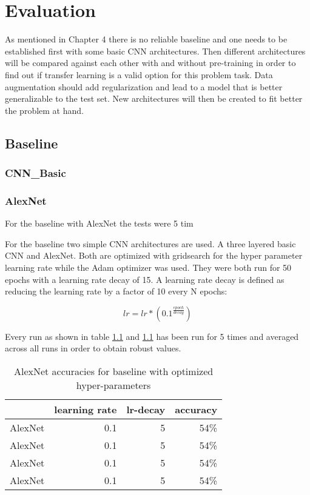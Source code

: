 \chapter{Evaluation}

As mentioned in Chapter 4 there is no reliable baseline and one needs to be established first with some basic CNN architectures. Then different architectures will be compared against each other with and without pre-training in order to find out if transfer learning is a valid option for this problem task. Data augmentation should add regularization and lead to a model that is better generalizable to the test set. New architectures will then be created to fit better the problem at hand.

\section{Baseline}

\subsection{CNN\_Basic}

\subsection{AlexNet}

For the baseline with AlexNet the tests were 5 tim

For the baseline two simple CNN architectures are used. A three layered basic CNN and AlexNet. Both are optimized with gridsearch for the hyper parameter learning rate while the Adam optimizer was used. They were both run for 50 epochs with a learning rate decay of 15. A learning rate decay is defined as reducing the learning rate by a factor of 10 every N epochs:

\[ lr = lr * (0.1^{\frac{epoch}{decay}}) \]


Every run as shown in table \ref{tbl:similarity-test-map} and \ref{tbl:similarity-test-map} has been run for 5 times and averaged across all runs in order to obtain robust values.

\begin{table}[t] \centering
{}
\caption{AlexNet accuracies for baseline with optimized hyper-parameters}
\begin{tabular}{@{}rrrr@{}}
\toprule & learning rate & lr-decay & accuracy \\
\midrule
AlexNet		& 0.1 		& 5		& 54\%  \\
AlexNet		& 0.1 		& 5		& 54\%  \\
AlexNet		& 0.1 		& 5		& 54\%  \\
AlexNet		& 0.1 		& 5		& 54\%  \\
\bottomrule
\end{tabular}
\label{tbl:similarity-test-map}
\end{table}

